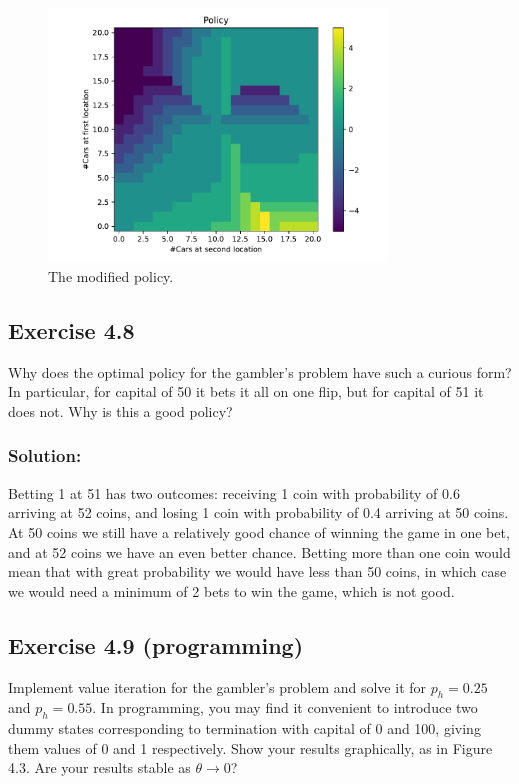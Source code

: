\begin{figure}[H]
    \centering
    \includegraphics[width=0.8\textwidth]{chapters_latex/figures/ex_04_07_modified.pdf}
    \caption{The modified policy.}
\end{figure}

\subsection*{Exercise 4.8}
Why does the optimal policy for the gambler's problem have such a curious form? In particular, for capital of 50
it bets it all on one flip, but for capital of 51 it does not. Why is this a good policy? 

\subsubsection*{Solution:}

Betting 1 at 51 has two outcomes: receiving 1 coin with probability of 0.6 arriving at 52 coins, and losing 1 coin with probability of 0.4 arriving at 50 coins. At 50 coins we still have a relatively good chance of winning the game in one bet, and at 52 coins we have an even better chance. Betting more than one coin would mean that with great probability we would have less than 50 coins, in which case we would need a minimum of 2 bets to win the game, which is not good.

\subsection*{Exercise 4.9 (programming)}
Implement value iteration for the gambler's problem and
solve it for $p_h = 0.25$ and $p_h = 0.55$. In programming, you may find it convenient to
introduce two dummy states corresponding to termination with capital of 0 and 100,
giving them values of 0 and 1 respectively. Show your results graphically, as in Figure 4.3.
Are your results stable as $\theta \rightarrow 0$?

